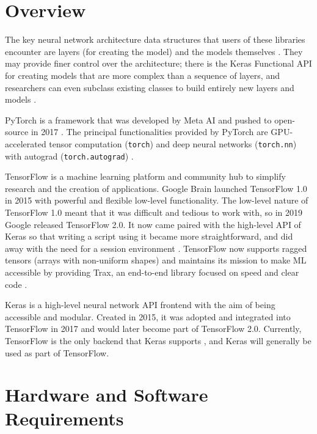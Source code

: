 \documentclass[conference]{IEEEtran}
\begin{document}
\section{Overview}
The key neural network architecture data structures that users of these libraries encounter are layers (for creating the model) and the models themselves \cite{Keras-Team}. They may provide finer control over the architecture; there is the Keras Functional API for creating models that are more complex than a sequence of layers, and researchers can even subclass existing classes to build entirely new layers and models \cite{Keras-Team}.

PyTorch is a framework that was developed by Meta AI and pushed to open-source in 2017 \cite{Paszke}. The principal functionalities provided by PyTorch are GPU-accelerated tensor computation (\verb+torch+) and deep neural networks (\verb+torch.nn+) with autograd (\verb+torch.autograd+) \cite{PyTorch}.

TensorFlow is a machine learning platform and community hub to simplify research and the creation of applications. Google Brain launched TensorFlow 1.0 in 2015 \cite{Terra} with powerful and flexible low-level functionality. The low-level nature of TensorFlow 1.0 meant that it was difficult and tedious to work with, so in 2019 Google released TensorFlow 2.0. It now came paired with the high-level API of Keras so that writing a script using it became more straightforward, and did away with the need for a session environment \cite{Gupta}. TensorFlow now supports ragged tensors (arrays with non-uniform shapes) \cite{Tensorflow-Ragged} and maintains its mission to make ML accessible by providing Trax, an end-to-end library focused on speed and clear code \cite{Tensorflow-Trax}.

Keras is a high-level neural network API frontend with the aim of being accessible and modular. Created in 2015, it was adopted and integrated into TensorFlow in 2017 \cite{Terra} and would later become part of TensorFlow 2.0. Currently, TensorFlow is the only backend that Keras supports \cite{Keras-FAQ}, and Keras will generally be used as part of TensorFlow.

\section{Hardware and Software Requirements}
\end{document}
